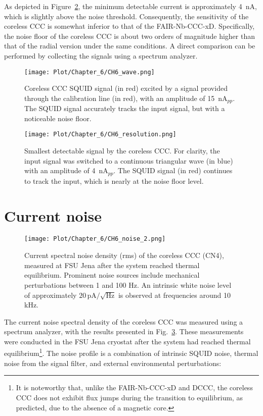 \documentclass[12pt,a4paper]{report}
\begin{document}
       As depicted in Figure~\ref{CH6_sensitivity}, the minimum detectable current is approximately 4~nA, which is slightly above the noise threshold. Consequently, the sensitivity of the coreless CCC is somewhat inferior to that of the FAIR-Nb-CCC-xD. Specifically, the noise floor of the coreless CCC is about two orders of magnitude higher than that of the radial version under the same conditions. A direct comparison can be performed by collecting the signals using a spectrum analyzer.
       
       \begin{figure}[H]
       	\centering
       	\texttt{[image: Plot/Chapter\_6/CH6\_wave.png]}
       	\caption{\small{Coreless CCC SQUID signal (in red) excited by a signal provided through the calibration line (in red), with an amplitude of 15~nA$_{pp}$. The SQUID signal accurately tracks the input signal, but with a noticeable noise floor.}}
       	\label{Ch6_wave}
       \end{figure}
       
       \begin{figure}[H]
       	\centering
       	\texttt{[image: Plot/Chapter\_6/CH6\_resolution.png]}
       	\caption{\small{Smallest detectable signal by the coreless CCC. For clarity, the input signal was switched to a continuous triangular wave (in blue) with an amplitude of 4~nA$_{pp}$. The SQUID signal (in red) continues to track the input, which is nearly at the noise floor level.}}
       	\label{CH6_sensitivity}
       \end{figure}
       \section{Current noise}
        \begin{figure}[H]
        	\centering
        	\texttt{[image: Plot/Chapter\_6/CH6\_noise\_2.png]}
        	\caption{\small{Current spectral noise density (rms) of the coreless CCC (CN4), measured at FSU Jena after the system reached thermal equilibrium. Prominent noise sources include mechanical perturbations between 1 and 100 Hz. An intrinsic white noise level of approximately $20 \, \text{pA}/\sqrt{\text{Hz}}$ is observed at frequencies around 10 kHz.}}
        	\label{CH6_noise} 
        \end{figure}
        
        The current noise spectral density of the coreless CCC was measured using a spectrum analyzer, with the results presented in Fig.~\ref{CH6_noise}. These measurements were conducted in the FSU Jena cryostat after the system had reached thermal equilibrium\footnote{It is noteworthy that, unlike the FAIR-Nb-CCC-xD and DCCC, the coreless CCC does not exhibit flux jumps during the transition to equilibrium, as predicted, due to the absence of a magnetic core.}. The noise profile is a combination of intrinsic SQUID noise, thermal noise from the signal filter, and external environmental perturbations:
        
\end{document}
